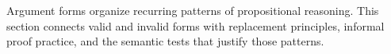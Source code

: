\begin{remark*}[Exposition]
Argument forms organize recurring patterns of propositional reasoning. This
section connects valid and invalid forms with replacement principles, informal
proof practice, and the semantic tests that justify those patterns.
\end{remark*}
